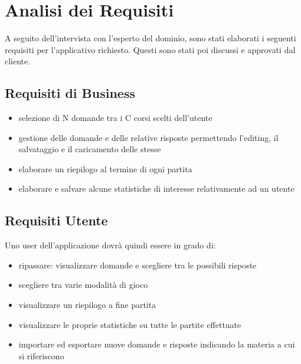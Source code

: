 

\chapter{Analisi dei Requisiti}
A seguito dell'intervista con l'esperto del dominio, sono stati elaborati i seguenti requisiti per l'applicativo richiesto. Questi sono stati poi discussi e approvati dal cliente.
	\section{Requisiti di Business}
	\begin{itemize}
        \item selezione di N domande tra i C corsi scelti dell'utente
        \item gestione delle domande e delle relative risposte permettendo l'editing, il salvataggio e il caricamento delle stesse
        \item elaborare un riepilogo al termine di ogni partita
        \item elaborare e salvare alcune statistiche di interesse relativamente ad un utente
    \end{itemize}
	
	\section{Requisiti Utente}
    Uno user dell'applicazione dovrà quindi essere in grado di:
    \begin{itemize}
        \item ripassare: visualizzare domande e scegliere tra le possibili risposte
        \item scegliere tra varie modalità di gioco
        \item visualizzare un riepilogo a fine partita
        \item visualizzare le proprie statistiche su tutte le partite effettuate
        \item importare ed esportare nuove domande e risposte indicando la materia a cui si riferiscono
    \end{itemize}
 
